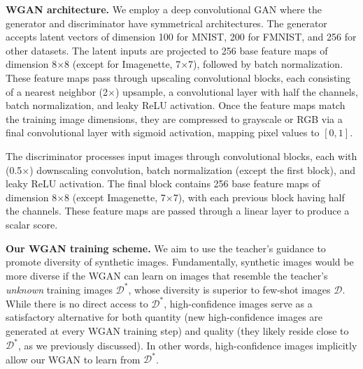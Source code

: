 \begin{foldable}
  \textbf{WGAN architecture.} We employ a deep convolutional GAN where the generator and discriminator have symmetrical architectures.
  The generator accepts latent vectors of dimension 100 for MNIST, 200 for FMNIST, and 256 for other datasets.
  The latent inputs are projected to 256 base feature maps of dimension 8$\times$8 (except for Imagenette, 7$\times$7), followed by batch normalization.
  These feature maps pass through upscaling convolutional blocks, each consisting of a nearest neighbor (2$\times$) upsample, a convolutional layer with half the channels, batch normalization, and leaky ReLU activation.
  Once the feature maps match the training image dimensions, they are compressed to grayscale or RGB via a final convolutional layer with sigmoid activation, mapping pixel values to $[0, 1]$.

  The discriminator processes input images through convolutional blocks, each with (0.5$\times$) downscaling convolution, batch normalization (except the first block), and leaky ReLU activation.
  The final block contains 256 base feature maps of dimension 8$\times$8 (except Imagenette, 7$\times$7), with each previous block having half the channels.
  These feature maps are passed through a linear layer to produce a scalar score.
\end{foldable}

\begin{foldable}
  \textbf{Our WGAN training scheme.}
  We aim to use the teacher's guidance to promote diversity of synthetic images.
  Fundamentally, synthetic images would be more diverse if the WGAN can learn on images that resemble the teacher's \textit{unknown} training images $\mathcal{D}^{*}$, whose diversity is superior to few-shot images $\mathcal{D}$.
  While there is no direct access to $\mathcal{D}^{*}$, high-confidence images serve as a satisfactory alternative for both quantity (new high-confidence images are generated at every WGAN training step) and quality (they likely reside close to $\mathcal{D}^{*}$, as we previously discussed).
  In other words, high-confidence images implicitly allow our WGAN to learn from $\mathcal{D}^{*}$.
\end{foldable}

